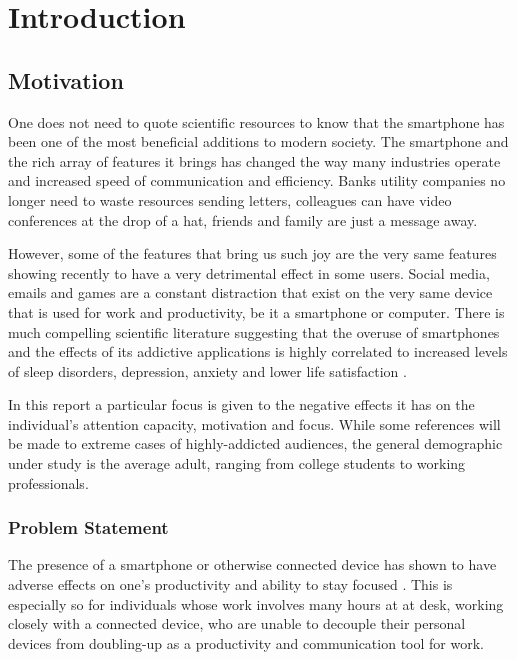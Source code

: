 \chapter{Introduction}

\section{Motivation}
One does not need to quote scientific resources to know that the smartphone has been one of the most beneficial additions to modern society. The smartphone and the rich array of features it brings has changed the way many industries operate and increased speed of communication and efficiency. Banks utility companies no longer need to waste resources sending letters, colleagues can have video conferences at the drop of a hat, friends and family are just a message away.

However, some of the features that bring us such joy are the very same features showing recently to have a very detrimental effect in some users. Social media, emails and games are a constant distraction that exist on the very same device that is used for work and productivity, be it a smartphone or computer. There is much compelling scientific literature suggesting that the overuse of smartphones and the effects of its addictive applications is highly correlated to increased levels of sleep disorders, depression, anxiety and lower life satisfaction \cite{abi2020smartphones, lee2014hooked, demirci2015relationship}.

In this report a particular focus is given to the negative effects it has on the individual's attention capacity, motivation and focus. While some references will be made to extreme cases of highly-addicted audiences, the general demographic under study is the average adult, ranging from college students to working professionals.

\subsection{Problem Statement}
The presence of a smartphone or otherwise connected device has shown to have adverse effects on one's productivity and ability to stay focused \cite{thornton2014mere}. This is especially so for individuals whose work involves many hours at at desk, working closely with a connected device, who are unable to decouple their personal devices from doubling-up as a productivity and communication tool for work.

